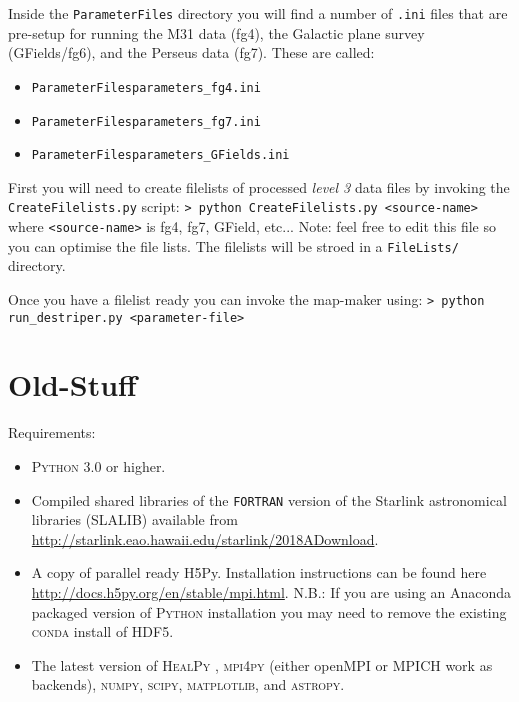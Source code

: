 \documentclass[11pt]{article}
\begin{document}
Inside the \texttt{ParameterFiles} directory you will find a number of \texttt{.ini} files that are pre-setup for running the M31 data (fg4), the Galactic plane survey (GFields/fg6), and the Perseus data (fg7). These are called:
\begin{itemize}
\item \texttt{ParameterFiles\/parameters\_fg4.ini}
\item \texttt{ParameterFiles\/parameters\_fg7.ini}
\item \texttt{ParameterFiles\/parameters\_GFields.ini}
\end{itemize}

First you will need to create filelists of processed \textit{level 3} data files by invoking the \texttt{CreateFilelists.py} script:
\newline\noindent
\texttt{> python CreateFilelists.py <source-name>}
\newline\noindent
where \texttt{<source-name>} is fg4, fg7, GField, etc... Note: feel free to edit this file so you can optimise the file lists. The filelists will be stroed in a \texttt{FileLists/} directory.

Once you have a filelist ready you can invoke the map-maker using:
\newline\noindent
\texttt{> python run\_destriper.py <parameter-file>}
\newline\noindent


\section{Old-Stuff}

Requirements:
\begin{itemize}
\item \textsc{Python} 3.0 or higher.
\item Compiled shared libraries of the \texttt{FORTRAN} version of the Starlink astronomical libraries (SLALIB) available from \url{http://starlink.eao.hawaii.edu/starlink/2018ADownload}.
\item A copy of parallel ready H5Py. Installation instructions can be found here \url{http://docs.h5py.org/en/stable/mpi.html}. N.B.: If you are using an Anaconda packaged version of \textsc{Python} installation you may need to remove the existing \textsc{conda} install of HDF5.
\item The latest version of \textsc{HealPy} , \textsc{mpi4py} (either openMPI or MPICH work as backends), \textsc{numpy}, \textsc{scipy}, \textsc{matplotlib}, and \textsc{astropy}.
\end{itemize}
\end{document}

